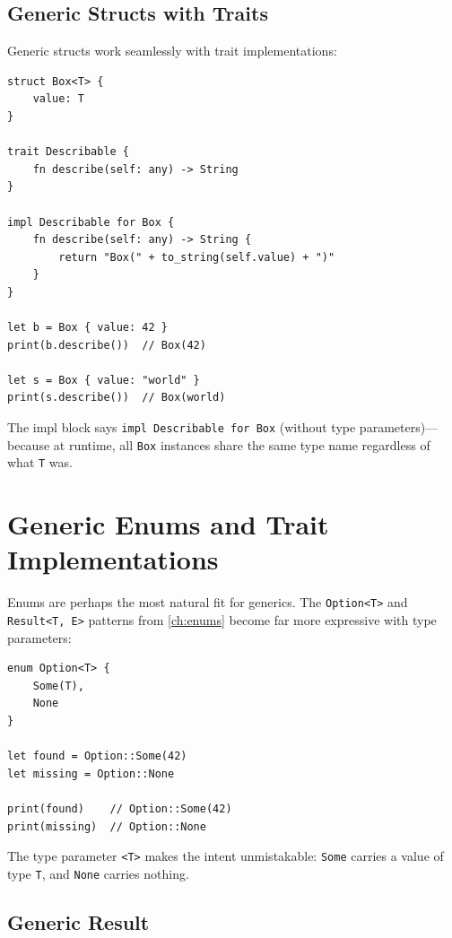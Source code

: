 \subsection{Generic Structs with Traits}

Generic structs work seamlessly with trait implementations:

\begin{lstlisting}[language=Lattice, caption={Traits on generic structs}]
struct Box<T> {
    value: T
}

trait Describable {
    fn describe(self: any) -> String
}

impl Describable for Box {
    fn describe(self: any) -> String {
        return "Box(" + to_string(self.value) + ")"
    }
}

let b = Box { value: 42 }
print(b.describe())  // Box(42)

let s = Box { value: "world" }
print(s.describe())  // Box(world)
\end{lstlisting}

The impl block says \lstinline|impl Describable for Box| (without type
parameters)---because at runtime, all \lstinline|Box| instances share the
same type name regardless of what \lstinline|T| was.

\section{Generic Enums and Trait Implementations}\label{sec:generics-enums}

Enums are perhaps the most natural fit for generics. The
\lstinline|Option<T>| and \lstinline|Result<T, E>| patterns from
\cref{ch:enums} become far more expressive with type parameters:

\begin{lstlisting}[language=Lattice, caption={A generic Option enum}]
enum Option<T> {
    Some(T),
    None
}

let found = Option::Some(42)
let missing = Option::None

print(found)    // Option::Some(42)
print(missing)  // Option::None
\end{lstlisting}

The type parameter \lstinline|<T>| makes the intent unmistakable:
\lstinline|Some| carries a value of type \lstinline|T|, and \lstinline|None|
carries nothing.

\subsection{Generic Result}

